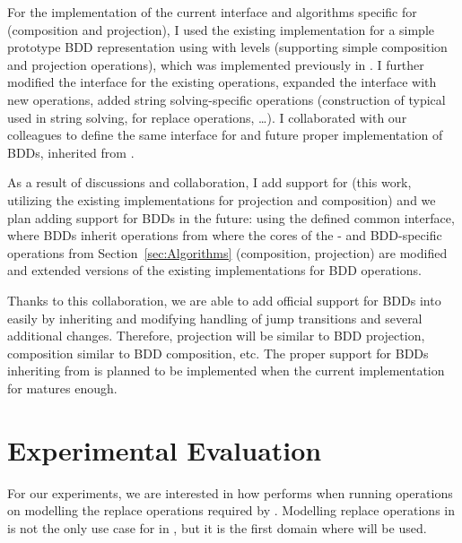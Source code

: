 For the implementation of the current interface and algorithms specific for \nfts (composition and projection), I used the existing implementation for a simple prototype BDD representation using \nfas with levels (supporting simple composition and projection operations), which was implemented previously in \mata.
I further modified the interface for the existing operations, expanded the interface with new operations, added string solving-specific operations (construction of typical \nfts used in string solving, \nfts for replace operations, \ldots).
I collaborated with our colleagues to define the same interface for \nfts and future proper implementation of BDDs, inherited from \nfts.

As a result of discussions and collaboration, I add support for \nfts (this work, utilizing the existing implementations for projection and composition) and we plan adding support for BDDs in the future: using the defined common interface, where BDDs inherit operations from \nfts where the cores of the \nft- and BDD-specific operations from Section~\ref{sec:Algorithms} (composition, projection) are modified and extended versions of the existing implementations for BDD operations.

Thanks to this collaboration, we are able to add official support for BDDs into \mata easily by inheriting \nft and modifying handling of jump transitions and several additional changes.
Therefore, \nft projection will be similar to BDD projection, \nft composition similar to BDD composition, etc.
The proper support for BDDs inheriting from \nfts is planned to be implemented when the current implementation for \nfts matures enough.

\chapter{Experimental Evaluation}
\label{chap:experiments}

For our experiments, we are interested in how \mata performs when running operations on \nfts modelling the replace operations required by \noodler.
Modelling replace operations in \noodler is not the only use case for \nfts in \mata, but it is the first domain where \nfts will be used.

